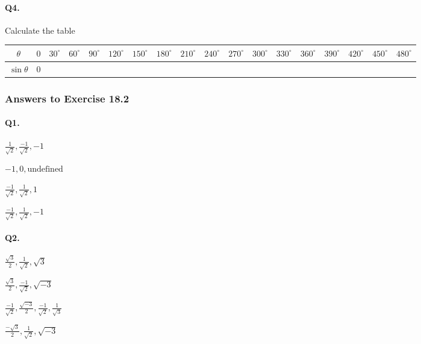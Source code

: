 \documentclass{article}
\begin{document}
\paragraph{Q4.}
Calculate the table

\begin{tabular}{|c|c|c|c|c|c|c|c|c|c|c|c|c|c|c|c|c|c|}
  \hline
$\theta$ & $0$ & $30^{\circ}$ & $60^{\circ}$ & $90^{\circ}$ & $120^{\circ}$ & $150^{\circ}$ & $180^{\circ}$ & $210^{\circ}$ & $240^{\circ}$ & $270^{\circ}$ & $300^{\circ}$ & $330^{\circ}$ & $360^{\circ}$ & $390^{\circ}$ & $420^{\circ}$ & $450^{\circ}$ & $480^{\circ}$ \\
  \hline
$\sin\theta$ & $0$ & & & & & & & & & & & & & & & & \\
  \hline
\end{tabular}

\subsubsection {Answers to Exercise 18.2}

\paragraph{Q1.}
\begin{enumerate*}[label=\alph*)]
          \item $\frac{1}{\sqrt{2}}, \frac{-1}{\sqrt{2}}, -1$
          \item $-1, 0, \text{undefined}$
          \item $\frac{-1}{\sqrt{2}}, \frac{1}{\sqrt{2}}, 1$
          \item $\frac{-1}{\sqrt{2}}, \frac{1}{\sqrt{2}}, -1$
\end{enumerate*}

\paragraph{Q2.}
\begin{enumerate*}[label=\alph*)]
          \item $\frac{\sqrt{3}}{2}, \frac{1}{\sqrt{2}}, \sqrt{3}$
          \item $\frac{\sqrt{3}}{2}, \frac{-1}{\sqrt{2}}, \sqrt{-3}$
          \item $\frac{-1}{\sqrt{2}}, \frac{\sqrt{-3}}{2}, \frac{-1}{\sqrt{2}}, \frac{1}{\sqrt{3}}$
          \item $\frac{-\sqrt{3}}{2}, \frac{1}{\sqrt{2}}, \sqrt{-3}$
\end{enumerate*}
\end{document}
